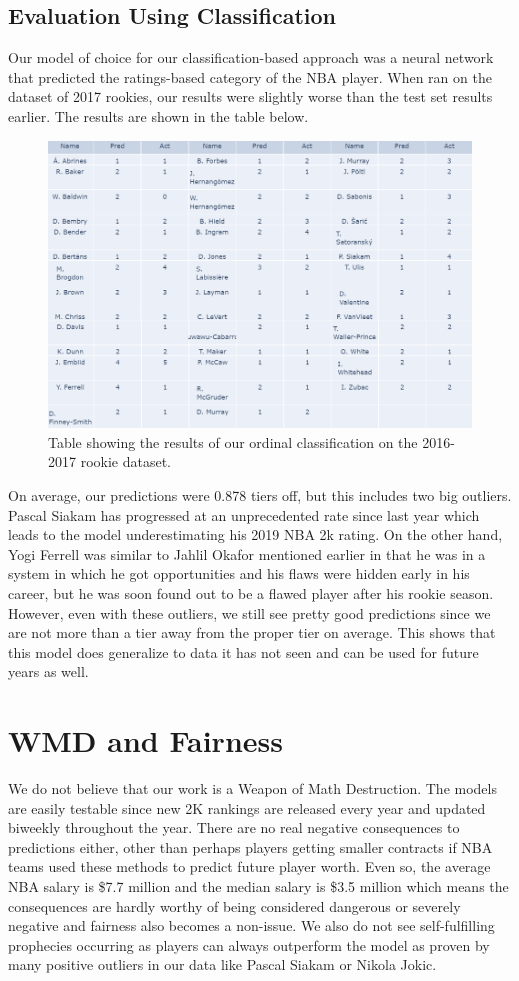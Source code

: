 \documentclass{article}
\begin{document}
\subsection{Evaluation Using Classification}
Our model of choice for our classification-based approach was a neural network that predicted the ratings-based category of the NBA player. When ran on the dataset of 2017 rookies, our results were slightly worse than the test set results earlier. The results are shown in the table below.
\begin{figure}[htp]
    \centering
    \includegraphics[width=12cm]{category_table17.PNG}
    \caption{Table showing the results of our ordinal classification on the 2016-2017 rookie dataset.}
\end{figure}

On average, our predictions were 0.878 tiers off, but this includes two big outliers. Pascal Siakam has progressed at an unprecedented rate since last year which leads to the model underestimating his 2019 NBA 2k rating. On the other hand, Yogi Ferrell was similar to Jahlil Okafor mentioned earlier in that he was in a system in which he got opportunities and his flaws were hidden early in his career, but he was soon found out to be a flawed player after his rookie season. However, even with these outliers, we still see pretty good predictions since we are not more than a tier away from the proper tier on average. This shows that this model does generalize to data it has not seen and can be used for future years as well.

\section{WMD and Fairness}
We do not believe that our work is a Weapon of Math Destruction. The models are easily testable since new 2K rankings are released every year and updated biweekly throughout the year. There are no real negative consequences to predictions either, other than perhaps players getting smaller contracts if NBA teams used these methods to predict future player worth. Even so, the average NBA salary is \$7.7 million and the median salary is \$3.5 million which means the consequences are hardly worthy of being considered dangerous or severely negative and fairness also becomes a non-issue. We also do not see self-fulfilling prophecies occurring as players can always outperform the model as proven by many positive outliers in our data like Pascal Siakam or Nikola Jokic.
\end{document}
